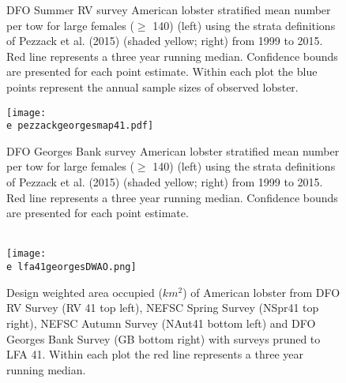 \documentclass[11pt]{article}
\newcommand{\e}{/backup/bio_data/bio.lobster/figures/} %
\begin{document}
\begin{landscape}
\begin{figure}
\centering
    
    \caption{DFO Summer RV survey American lobster stratified mean number per tow for large females ($\geq$ 140) (left) using the strata definitions of Pezzack et al. (2015) (shaded yellow; right) from 1999 to 2015. Red line represents a three year running median. Confidence bounds are presented for each point estimate. Within each plot the blue points represent the annual sample sizes of observed lobster.}

\end{figure}
\end{landscape}

\begin{landscape}
\begin{figure}
\centering
     \texttt{[image: \\e pezzackgeorgesmap41.pdf]}
    
    \caption{DFO Georges Bank survey American lobster stratified mean number per tow for large females ($\geq$ 140) (left) using the strata definitions of Pezzack et al. (2015) (shaded yellow; right) from 1999 to 2015. Red line represents a three year running median. Confidence bounds are presented for each point estimate. }

\end{figure}
\end{landscape}


\begin{figure}
\centering
{}\\
    \texttt{[image: \\e lfa41georgesDWAO.png]}

\caption{Design weighted area occupied ($km^2$) of American lobster from DFO RV Survey (RV 41 top left), NEFSC Spring Survey (NSpr41 top right), NEFSC Autumn Survey (NAut41 bottom left) and DFO Georges Bank Survey (GB bottom right) with surveys pruned to LFA 41. Within each plot the red line represents a three year running median. }
\end{figure}
\clearpage
\end{document}
